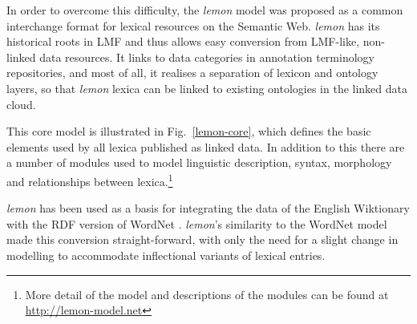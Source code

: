 In order to overcome this difficulty, the \emph{lemon} model \cite{mccrae2012interchanging} was proposed
as a common interchange format for lexical resources on the Semantic Web.
\emph{lemon} has its historical roots in LMF and thus allows 
easy conversion from LMF-like, non-linked data resources. 
It links to data categories in
  annotation terminology repositories, and most of all,
  it realises a separation of lexicon and ontology layers, so that \emph{lemon} lexica can be linked to existing ontologies
in the linked data cloud.


%

This core model is illustrated in Fig.\ \ref{lemon-core}, which defines the
basic elements used by all lexica published as linked data. In addition to this there
are a number of modules used to model linguistic description, syntax, morphology
and relationships between lexica.\footnote{More detail of the model and descriptions of
the modules can be found at \url{http://lemon-model.net}}

\emph{lemon} has been used as a basis for integrating the data of the
English Wiktionary
with
the RDF version of WordNet \cite{mccrae2012integrating}.
\emph{lemon}'s similarity
to the WordNet model made this conversion straight-forward, with only the need for
a slight change in modelling to accommodate inflectional variants of lexical
entries.

